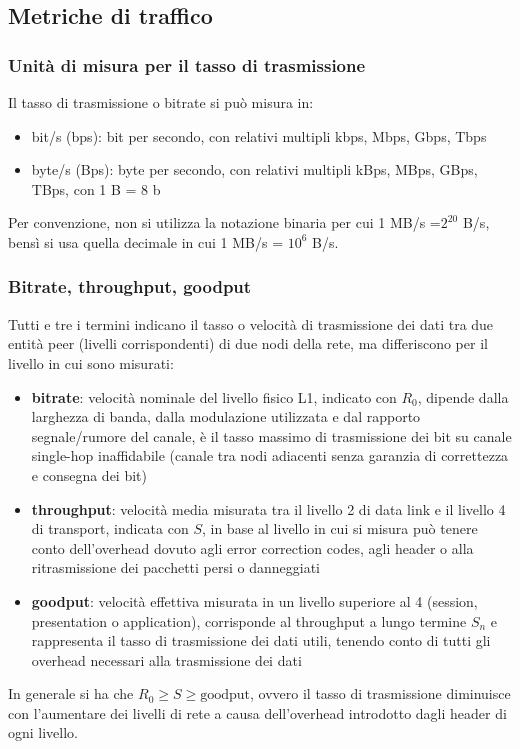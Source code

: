 \subsection{Metriche di traffico}
\subsubsection*{Unità di misura per il tasso di trasmissione}
Il tasso di trasmissione o bitrate si può misura in:
\begin{itemize}
	\item bit/s (bps): bit per secondo, con relativi multipli kbps, Mbps, Gbps, Tbps
	\item byte/s (Bps): byte per secondo, con relativi multipli kBps, MBps, GBps, TBps, con 1 B = 8 b
\end{itemize}
Per convenzione, non si utilizza la notazione binaria per cui 1 MB/s =\(2^{20}\) B/s, bensì si usa quella decimale in cui
1 MB/s = \(10^6\) B/s.

\subsubsection*{Bitrate, throughput, goodput}
Tutti e tre i termini indicano il tasso o velocità di trasmissione dei dati tra due entità peer (livelli corrispondenti)
di due nodi della rete, ma differiscono per il livello in cui sono misurati:
\begin{itemize}
	\item \textbf{bitrate}: velocità nominale del livello fisico L1, indicato con \(R_0\), dipende dalla larghezza di
	banda, dalla modulazione utilizzata e dal rapporto segnale/rumore del canale, è il tasso massimo di trasmissione
	dei bit su canale single-hop inaffidabile (canale tra nodi adiacenti senza garanzia di correttezza e consegna dei bit)
	\item \textbf{throughput}: velocità media misurata tra il livello 2 di data link e il livello 4 di transport,
	indicata con \(S\), in base al livello in cui si misura può tenere conto dell'overhead dovuto agli error
	correction codes, agli header o alla ritrasmissione dei pacchetti persi o danneggiati
	\item \textbf{goodput}: velocità effettiva misurata in un livello superiore al 4 (session, presentation o application),
	corrisponde al throughput a lungo termine \(S_n\) e rappresenta il tasso di trasmissione dei dati utili, tenendo conto di tutti
	gli overhead necessari alla trasmissione dei dati
\end{itemize}
In generale si ha che \(R_0 \geq S \geq \text{goodput}\), ovvero il tasso di trasmissione diminuisce con l'aumentare dei
livelli di rete a causa dell'overhead introdotto dagli header di ogni livello.

